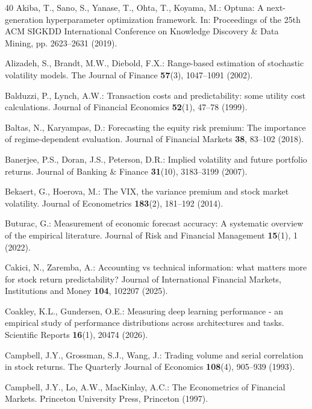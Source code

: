 \documentclass[runningheads,orivec]{llncs}
\begin{document}
\begin{thebibliography}{40}
Akiba, T., Sano, S., Yanase, T., Ohta, T., Koyama, M.: Optuna: A next-generation hyperparameter optimization framework. In: Proceedings of the 25th ACM SIGKDD International Conference on Knowledge Discovery \& Data Mining, pp. 2623--2631 (2019).

Alizadeh, S., Brandt, M.W., Diebold, F.X.: Range-based estimation of stochastic volatility models. The Journal of Finance \textbf{57}(3), 1047--1091 (2002).

Balduzzi, P., Lynch, A.W.: Transaction costs and predictability: some utility cost calculations. Journal of Financial Economics \textbf{52}(1), 47--78 (1999).

Baltas, N., Karyampas, D.: Forecasting the equity risk premium: The importance of regime-dependent evaluation. Journal of Financial Markets \textbf{38}, 83--102 (2018).

Banerjee, P.S., Doran, J.S., Peterson, D.R.: Implied volatility and future portfolio returns. Journal of Banking \& Finance \textbf{31}(10), 3183--3199 (2007).

Bekaert, G., Hoerova, M.: The VIX, the variance premium and stock market volatility. Journal of Econometrics \textbf{183}(2), 181--192 (2014).

Buturac, G.: Measurement of economic forecast accuracy: A systematic overview of the empirical literature. Journal of Risk and Financial Management \textbf{15}(1), 1 (2022).

Cakici, N., Zaremba, A.: Accounting vs technical information: what matters more for stock return predictability? Journal of International Financial Markets, Institutions and Money \textbf{104}, 102207 (2025).

Coakley, K.L., Gundersen, O.E.: Measuring deep learning performance - an empirical study of performance distributions across architectures and tasks. Scientific Reports \textbf{16}(1), 20474 (2026).

Campbell, J.Y., Grossman, S.J., Wang, J.: Trading volume and serial correlation in stock returns. The Quarterly Journal of Economics \textbf{108}(4), 905--939 (1993).

Campbell, J.Y., Lo, A.W., MacKinlay, A.C.: The Econometrics of Financial Markets. Princeton University Press, Princeton (1997).


\end{thebibliography}
\end{document}
